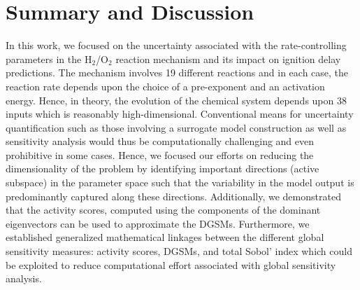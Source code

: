 \section{Summary and Discussion}
\label{sec:conc}

%
 
 In this work, we focused on the uncertainty associated with the rate-controlling parameters in
 the H$_2$/O$_2$ reaction mechanism and its impact on ignition delay predictions. The mechanism
 involves 19 different reactions and in each case, the reaction rate depends upon the choice of
 a pre-exponent and an activation energy. Hence, in theory, the evolution of the chemical system
 depends upon 38 inputs which is reasonably high-dimensional. Conventional means
 for uncertainty quantification such as those involving a surrogate model construction as well as
 sensitivity analysis would thus be computationally challenging and even prohibitive in some cases. 
 Hence, we focused our efforts on reducing the dimensionality of the problem by identifying important
 directions (active subspace) in the parameter space such that the variability in the model output is 
 predominantly captured along these directions. Additionally, we demonstrated that the activity scores,
 computed using the components of the dominant eigenvectors can be used to approximate the
 DGSMs. Furthermore, we established generalized mathematical linkages between the different global sensitivity measures:
 activity scores, DGSMs, and total Sobol' index which could be exploited to reduce computational effort 
 associated with global sensitivity analysis. 
 
